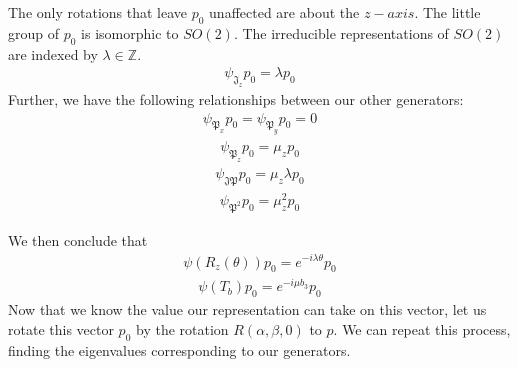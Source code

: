 \documentclass[compress,aspectratio=169,10pt,usenames,dvipsnames]{beamer}
\newcommand{\Z}{\mathbb{Z}}
\begin{document}
\begin{frame}
\vfill
The only rotations that leave $p_0$ unaffected are about the $z-axis$. The little group of $p_0$ is isomorphic to $SO(2)$.
\vfill
The irreducible representations of $SO(2)$ are indexed by $\lambda\in\Z$.
\begin{equation}
\begin{aligned}\psi_{\mathfrak{J}_z}p_0 = \lambda p_0
\end{aligned}\end{equation}
\vfill
Further, we have the following relationships between our other generators:
\begin{equation}
\begin{aligned}\psi_{\mathfrak{P}_x}p_0 = \psi_{\mathfrak{P}_y}p_0 = 0
\end{aligned}
\end{equation}
\begin{equation}
\begin{aligned}
\psi_{\mathfrak{P}_z}p_0 = \mu_z p_0
\end{aligned}
\end{equation}
\begin{equation}
\begin{aligned}
	\psi_{\mathfrak{JP}}p_0 = \mu_z\lambda p_0
\end{aligned}
\end{equation}
\begin{equation}
\begin{aligned}
	\psi_{\mathfrak{P}^2}p_0 = \mu_z^2p_0
\end{aligned}
\end{equation}
\vfill
\end{frame}
%
%
\begin{frame}
\vfill
We then conclude that
\vfill
\begin{equation}
\begin{aligned}
	\psi(R_z(\theta)) p_0 = e^{-i\lambda\theta}p_0
\end{aligned}
\end{equation}
\begin{equation}
\begin{aligned}
	\psi(T_b) p_0 = e^{-i\mu b_3}p_0
\end{aligned}
\end{equation}
\vfill
Now that we know the value our representation can take on this vector, let us rotate this vector $p_0$ by the rotation $R(\alpha,\beta,0)$ to $p$. 
\vfill
We can repeat this process, finding the eigenvalues corresponding to our generators.
\end{frame}
\end{document}
